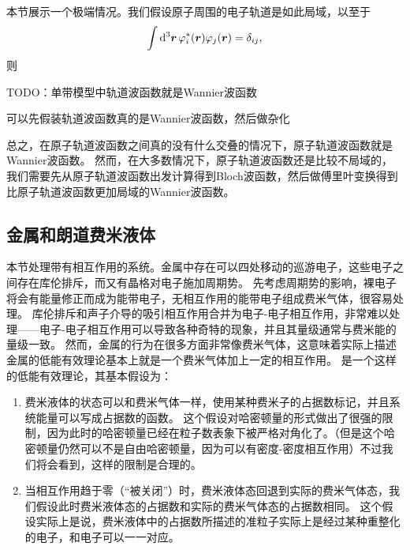 本节展示一个极端情况。我们假设原子周围的电子轨道是如此局域，以至于
\begin{equation}
    \int \dd[3]{\vb*{r}} \varphi_i^*(\vb*{r}) \varphi_j(\vb*{r}) = \delta_{ij},
\end{equation}
则

TODO：单带模型中轨道波函数就是Wannier波函数

可以先假装轨道波函数真的是Wannier波函数，然后做杂化

总之，在原子轨道波函数之间真的没有什么交叠的情况下，原子轨道波函数就是Wannier波函数。
然而，在大多数情况下，原子轨道波函数还是比较不局域的，我们需要先从原子轨道波函数出发计算得到Bloch波函数，然后做傅里叶变换得到比原子轨道波函数更加局域的Wannier波函数。

\subsection{金属和朗道费米液体}

本节处理带有相互作用的系统。金属中存在可以四处移动的巡游电子，这些电子之间存在库伦排斥，而又有晶格对电子施加周期势。
先考虑周期势的影响，裸电子将会有能量修正而成为能带电子，无相互作用的能带电子组成费米气体，很容易处理。
库伦排斥和声子介导的吸引相互作用合并为电子-电子相互作用，非常难以处理——电子-电子相互作用可以导致各种奇特的现象，并且其量级通常与费米能的量级一致。
然而，金属的行为在很多方面非常像费米气体，这意味着实际上描述金属的低能有效理论基本上就是一个费米气体加上一定的相互作用。
是一个这样的低能有效理论，其基本假设为：
\begin{enumerate}
    \item 费米液体的状态可以和费米气体一样，使用某种费米子的占据数标记，并且系统能量可以写成占据数的函数。
    这个假设对哈密顿量的形式做出了很强的限制，因为此时的哈密顿量已经在粒子数表象下被严格对角化了。（但是这个哈密顿量仍然可以不是自由哈密顿量，因为可以有密度-密度相互作用）不过我们将会看到，这样的限制是合理的。
    \item 当相互作用趋于零（“被关闭”）时，费米液体态回退到实际的费米气体态，我们假设此时费米液体态的占据数和实际的费米气体态的占据数相同。
    这个假设实际上是说，费米液体中的占据数所描述的准粒子实际上是经过某种重整化的电子，和电子可以一一对应。
\end{enumerate}

